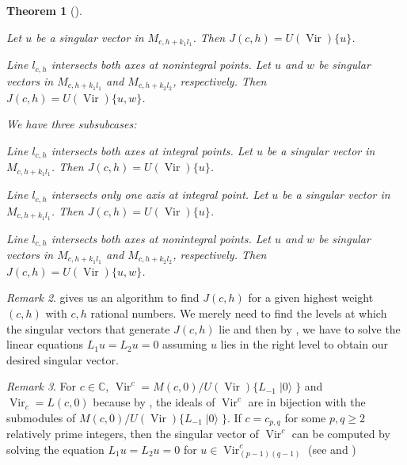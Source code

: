 \documentclass[a4paper, 12pt, reqno]{amsart}
\newtheorem{theorem}{Theorem}[section]
\theoremstyle{remark}
\newtheorem{remark}[theorem]{Remark}
\numberwithin{equation}{subsection}
\DeclareMathOperator{\Vir}{Vir}
\DeclareMathOperator{\vac}{|0\rangle}
\begin{document}
\begin{theorem}[{\cite{astashkevich_structure_1997}}]
\begin{description}[leftmargin = !]
\begin{description}[leftmargin = !]
\begin{description}[leftmargin = !]
        Let $u$ be a singular vector in $M_{c, h + k_1l_1}$.
        Then $J(c, h) = U(\Vir)\{u\}$.
      \item[Subsubcase III$_-$] Line $l_{c, h}$ intersects both axes at nonintegral points.
        Let $u$ and $w$ be singular vectors in $M_{c, h + k_1l_1}$ and $M_{c, h + k_2l_2}$, respectively.
        Then $J(c, h) = U(\Vir)\{u, w\}$.
      \end{description}
    \item[Subcase $c\ge 25$] We have three subsubcases:
      \begin{description}[leftmargin = !]
      \item[Subsubcase III$^{00}_+$] Line $l_{c, h}$ intersects both axes at integral points.
        Let $u$ be a singular vector in $M_{c, h + k_1l_1}$.
        Then $J(c, h) = U(\Vir)\{u\}$.
      \item[Subsubcase III$^0_+$] Line $l_{c, h}$ intersects only one axis at integral point.
        Let $u$ be a singular vector in $M_{c, h + k_1l_1}$.
        Then $J(c, h) = U(\Vir)\{u\}$.
      \item[Subsubcase III$_+$] Line $l_{c, h}$ intersects both axes at nonintegral points.
        Let $u$ and $w$ be singular vectors in $M_{c, h + k_1l_1}$ and $M_{c, h + k_2l_2}$, respectively.
        Then $J(c, h) = U(\Vir)\{u, w\}$.
      \end{description}
    \end{description}
  \end{description}
\end{theorem}

\begin{remark}
  \label{rmk:28}
   gives us an algorithm to find $J(c, h)$ for a given highest weight $(c, h)$ with $c, h$ rational numbers.
  We merely need to find the levels at which the singular vectors that generate $J(c, h)$ lie and then by , we have to solve the linear equations $L_1u = L_2 u = 0$ assuming $u$ lies in the right level to obtain our desired singular vector.
\end{remark}

\begin{remark}
  \label{rmk:29}
  For $c \in \mathbb{C}$, $\Vir^c = M(c, 0)/U(\Vir)\{L_{-1}\vac\}$ and $\Vir_c = L(c, 0)$ because by , the ideals of $\Vir^c$ are in bijection with the submodules of $M(c, 0)/U(\Vir)\{L_{-1}\vac\}$.
  If $c = c_{p, q}$ for some $p, q \ge 2$ relatively prime integers, then the singular vector of $\Vir^c$ can be computed by solving the equation $L_1u = L_2u = 0$ for $u \in \Vir^c_{(p - 1)(q - 1)}$ (see  and )
\end{remark}
\end{document}
